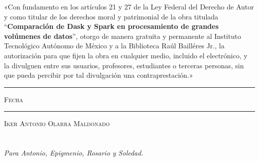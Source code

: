 \documentclass[11pt, oneside]{book}
\begin{document}

\thispagestyle{empty}

\vspace*{\fill}
\begingroup

\noindent
«Con fundamento en los artículos 21 y 27 de la Ley Federal del Derecho de Autor y como titular de los derechos moral y patrimonial de la obra titulada ``\textbf{Comparación de Dask y Spark en procesamiento de grandes volúmenes de datos}'', otorgo de manera gratuita y permanente al Instituto Tecnológico Autónomo de México y a la Biblioteca Raúl Bailléres Jr., la autorización para que fijen la obra en cualquier medio, incluido el electrónico, y la divulguen entre sus usuarios, profesores, estudiantes o terceras personas, sin que pueda percibir por tal divulgación una contraprestación.»


\centering 

\vspace{5em}

\rule[1em]{20em}{0.5pt} %

\textsc{Fecha}
 
\vspace{8em}

\rule[1em]{20em}{0.5pt} %

\textsc{Iker Antonio Olarra Maldonado}

\endgroup
\vspace*{\fill}


\pagestyle{plain}
\frontmatter

\chapter*{}
\begin{flushright}
\textit{Para Antonio, Epigmenio, Rosario y Soledad.}
\end{flushright}

\end{document}
